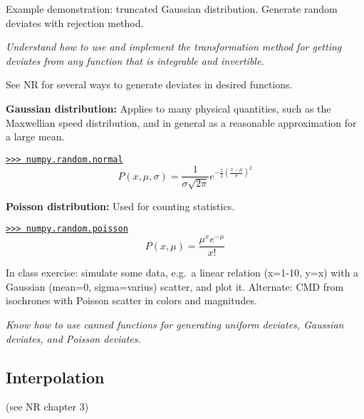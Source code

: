 \documentclass{article}
\newcommand{\test}[1]{%
    \begin{center}
        \colorbox{hl}{\parbox{0.9\textwidth}{\emph{#1}}}
    \end{center}}
\begin{document}
Example demonstration: truncated Gaussian distribution. Generate random
deviates with rejection method.

\test{Understand how to use and implement the transformation method for
getting deviates from any function that is integrable and invertible.}

See NR for several ways to generate deviates in desired functions.

{\bf Gaussian distribution:}
Applies to many physical quantities, such as the Maxwellian speed distribution,
and in general as a reasonable approximation for a large mean.

\href{http://docs.scipy.org/doc/numpy/reference/generated/numpy.random.normal.html}
{\tt >>> numpy.random.normal}
\begin{equation*}
    P(x,\mu,\sigma) = \frac{1}{\sigma\sqrt{2\pi}}
    e^{-\frac{1}{2}(\frac{x-\mu}{\sigma})^2   }
\end{equation*}

{\bf Poisson distribution:}
Used for counting statistics.

\href{http://docs.scipy.org/doc/numpy/reference/generated/numpy.random.poisson.html}
{\tt >>> numpy.random.poisson}
\begin{equation*}
    P(x,\mu) = \frac{\mu^xe^{-\mu}}{x!}
\end{equation*}

In class exercise: simulate some data, e.g.\ a linear relation (x=1-10, y=x)
with a Gaussian (mean=0, sigma=varius) scatter, and plot it.
Alternate: CMD from
isochrones with Poisson scatter in colors and magnitudes.

\test{Know how to use canned functions for generating uniform deviates,
Gaussian deviates, and Poisson deviates.}

\subsection{Interpolation}
(see NR chapter 3)
\end{document}

